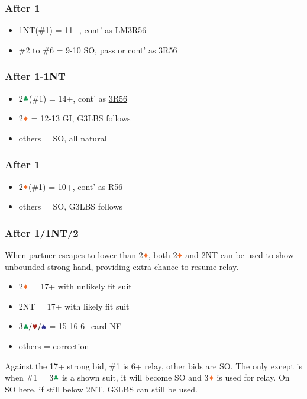 \documentclass{article}
\begin{document}
\begin{multicols}{2}
\subsubsection{After 1\SSS}
\begin{itemize}
    \item 1NT(\#1) = 11+, cont' as \hyperref[sec:nlm3r56]{LM3R56}
    \item \#2 to \#6 = 9-10 SO, pass or cont' as \hyperref[sec:nlm3r56]{3R56}
\end{itemize}

\subsubsection{After 1\HHH-1NT}
\begin{itemize}
    \item 2$\ccc$(\#1) = 14+, cont' as \hyperref[sec:nlm3r56]{3R56}
    \item 2$\ddd$ = 12-13 GI, G3LBS follows
    \item others = SO, all natural
\end{itemize}

\subsubsection{After 1\CCC}
\begin{itemize}
    \item 2$\ddd$(\#1) = 10+, cont' as \hyperref[sec:nlm3r56]{R56}
    \item others = SO, G3LBS follows
\end{itemize}

\subsubsection{After 1\SSS/1NT/2\CCC}\label{sec:1d-escape}
When partner escapes to lower than 2$\ddd$, both 2$\ddd$ and 2NT can be used to show unbounded strong hand, providing extra chance to resume relay.
\begin{itemize}
    \item 2$\ddd$ = 17+ with unlikely fit suit
    \item 2NT = 17+ with likely fit suit
    \item 3$\ccc/\hhh/\sss$ = 15-16 6+card NF
    \item others = correction
\end{itemize}

\noindent Against the 17+ strong bid, \#1 is 6+ relay, other bids are SO. The only except is when \#1 = 3$\ccc$ is a shown suit, it will become SO and 3$\ddd$ is used for relay. On SO here, if still below 2NT, G3LBS can still be used.


\end{multicols}
\end{document}
